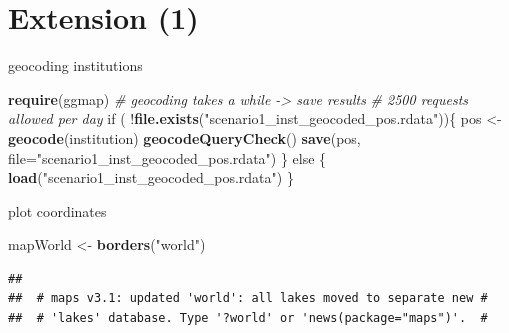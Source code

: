 \documentclass[ignorenonframetext,]{beamer}
\newenvironment{Shaded}{\begin{snugshade}}{\end{snugshade}}
\newcommand{\KeywordTok}[1]{\textcolor[rgb]{0.13,0.29,0.53}{\textbf{{#1}}}}
\newcommand{\DataTypeTok}[1]{\textcolor[rgb]{0.13,0.29,0.53}{{#1}}}
\newcommand{\DecValTok}[1]{\textcolor[rgb]{0.00,0.00,0.81}{{#1}}}
\newcommand{\StringTok}[1]{\textcolor[rgb]{0.31,0.60,0.02}{{#1}}}
\newcommand{\CommentTok}[1]{\textcolor[rgb]{0.56,0.35,0.01}{\textit{{#1}}}}
\newcommand{\NormalTok}[1]{{#1}}
\begin{document}
\section{Extension (1)}\label{extension-1}

\begin{frame}[fragile]{geocoding institutions}

\begin{Shaded}
\begin{Highlighting}[]
\KeywordTok{require}\NormalTok{(ggmap)}
\CommentTok{# geocoding takes a while -> save results}
\CommentTok{# 2500 requests allowed per day}
\NormalTok{if ( !}\KeywordTok{file.exists}\NormalTok{(}\StringTok{"scenario1_inst_geocoded_pos.rdata"}\NormalTok{))\{}
  \NormalTok{pos <-}\StringTok{ }\KeywordTok{geocode}\NormalTok{(institution)}
  \KeywordTok{geocodeQueryCheck}\NormalTok{() }
  \KeywordTok{save}\NormalTok{(pos, }\DataTypeTok{file=}\StringTok{"scenario1_inst_geocoded_pos.rdata"}\NormalTok{)}
\NormalTok{\} else \{}
  \KeywordTok{load}\NormalTok{(}\StringTok{"scenario1_inst_geocoded_pos.rdata"}\NormalTok{)}
\NormalTok{\}}
\end{Highlighting}
\end{Shaded}

\end{frame}

\begin{frame}[fragile]{plot coordinates}

\begin{Shaded}
\begin{Highlighting}[]
\NormalTok{mapWorld <-}\StringTok{ }\KeywordTok{borders}\NormalTok{(}\StringTok{"world"}\NormalTok{)}
\end{Highlighting}
\end{Shaded}

\begin{verbatim}
## 
##  # maps v3.1: updated 'world': all lakes moved to separate new #
##  # 'lakes' database. Type '?world' or 'news(package="maps")'.  #
\end{verbatim}

\begin{Shaded}
\end{Shaded}

\end{frame}
\end{document}
